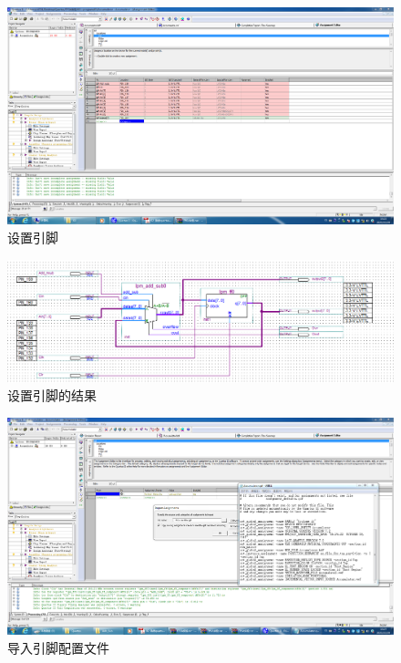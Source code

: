\documentclass[11pt]{SEU-Digital-Report}
\begin{document}
      \begin{figure}[h!]
        \includegraphics[width=\linewidth]{fig/Altera/6.PNG}
        \caption{设置引脚}
        \label{fig:Altera_4}\label{fig:Altera_6}
      \end{figure}

      \newpage
      \begin{figure}[htbp]
        \includegraphics[width=\linewidth]{fig/Altera/5.PNG}
        \caption{设置引脚的结果}
        \label{fig:Altera_5}
      \end{figure}

      \begin{figure}[h!]
        \includegraphics[width=\linewidth]{fig/Altera/7.PNG}
        \caption{导入引脚配置文件}
        \label{fig:Altera_7}
      \end{figure}
\end{document}
